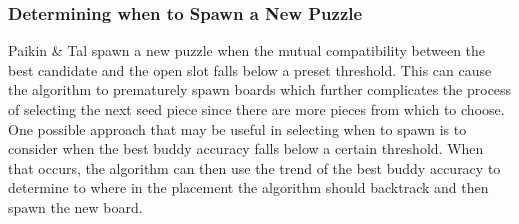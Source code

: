 \documentclass{report}
\begin{document}
\subsubsection{Determining when to Spawn a New Puzzle}\label{sec:limitationWhenToSpawnNewPuzzle}

Paikin \& Tal spawn a new puzzle when the mutual compatibility between the best candidate and the open slot falls below a preset threshold.  This can cause the algorithm to prematurely spawn boards which further complicates the process of selecting the next seed piece since there are more pieces from which to choose.  One possible approach that may be useful in selecting when to spawn is to consider when the best buddy accuracy falls below a certain threshold.  When that occurs, the algorithm can then use the trend of the best buddy accuracy to determine to where in the placement the algorithm should backtrack and then spawn the new board.









\pagebreak


\end{document}

